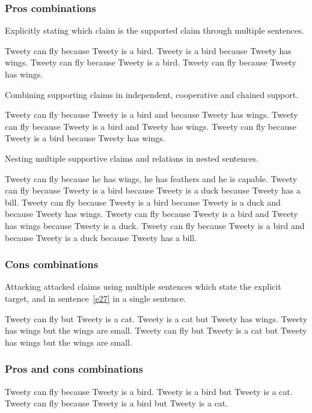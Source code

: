 \subsubsection{Pros combinations}
Explicitly stating which claim is the supported claim through multiple sentences.
\begin{exe}
\ex\label{e16} Tweety can fly because Tweety is a bird. Tweety is a bird because Tweety has wings.
\ex\label{e17} Tweety can fly because Tweety is a bird. Tweety can fly because Tweety has wings.
\end{exe}

\noindent Combining supporting claims in independent, cooperative and chained support.
\begin{exe}
\ex\label{e18} Tweety can fly because Tweety is a bird and because Tweety has wings.
\ex\label{e19} Tweety can fly because Tweety is a bird and Tweety has wings.
\ex\label{e20} Tweety can fly because Tweety is a bird because Tweety has wings.
\end{exe}

\noindent Nesting multiple supportive claims and relations in nested sentences.
\begin{exe}
\ex\label{e21} Tweety can fly because he has wings, he has feathers and he is capable.
\ex\label{e22} Tweety can fly because Tweety is a bird because Tweety is a duck because Tweety has a bill.
\ex\label{e23} Tweety can fly because Tweety is a bird because Tweety is a duck and because Tweety has wings.
\ex\label{e24} Tweety can fly because Tweety is a bird and Tweety has wings because Tweety is a duck.
\ex\label{e25} Tweety can fly because Tweety is a bird and because Tweety is a duck because Tweety has a bill.
\end{exe}

\subsubsection{Cons combinations}
Attacking attacked claims using multiple sentences which state the explicit target, and in sentence~\ref{e27} in a single sentence. 
\begin{exe}
\ex\label{e26} Tweety can fly but Tweety is a cat. Tweety is a cat but Tweety has wings. Tweety has wings but the wings are small.
\ex\label{e27} Tweety can fly but Tweety is a cat but Tweety has wings but the wings are small.
\end{exe}

\subsubsection{Pros and cons combinations}
\begin{exe}
\ex\label{e28} Tweety can fly because Tweety is a bird. Tweety is a bird but Tweety is a cat.
\ex\label{e29} Tweety can fly because Tweety is a bird but Tweety is a cat.
\end{exe}

